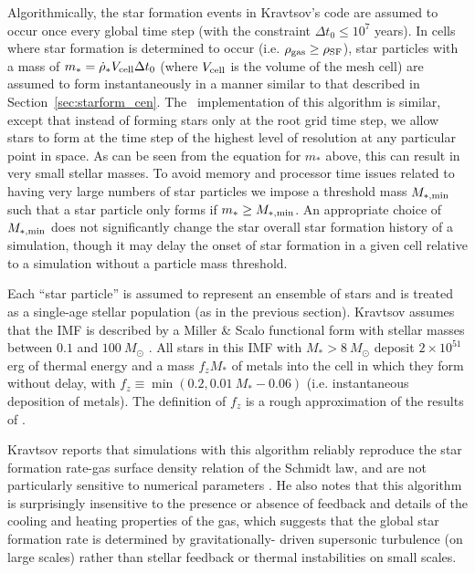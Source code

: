 Algorithmically, the star formation events in Kravtsov's code are
assumed to occur once every global time step (with the constraint $\Delta t_0 \leq
10^7$ years).
In cells where star formation is determined to occur (i.e. $\rho_{\rm
  gas} \geq \rho_{\rm SF}$), star particles with a mass of $m_* =
\dot{\rho}_* V_{\rm cell} \Delta t_0$ (where $V_{\rm cell}$ is the
volume of the mesh cell) are assumed to form instantaneously in a
manner similar to that described in Section~\ref{sec:starform_cen}.
The \enzo\ implementation of this algorithm is similar, except that
instead of forming stars only at the root grid time step, we allow
stars to form at the time step of the highest level of resolution at
any particular point in space.  As can be seen from the equation for
$m_*$ above, this can result in very small stellar masses.  To avoid
memory and processor time issues related to having very large numbers
of star particles we impose a threshold mass $M_{\rm *,min}$ such that
a star particle only forms if $m_* \geq M_{\rm *,min}$.  An
appropriate choice of $M_{\rm *,min}$ does not significantly change
the star overall star formation history of a simulation, though it may
delay the onset of star formation in a given cell relative to a
simulation without a particle mass threshold.

Each ``star particle'' is assumed to represent an ensemble of stars
and is treated as a single-age stellar population (as in the previous
section).  Kravtsov assumes that the IMF is described by a Miller \&
Scalo functional form with stellar masses between $0.1$ and
$100~M_\odot$ \citep{1979ApJS...41..513M}.  All stars in this IMF with
$M_* > 8~M_\odot$ deposit $2 \times 10^{51}$ erg of thermal energy
and a mass $f_z M_*$ of metals into the cell in which they form
without delay, with $f_z \equiv \min(0.2, 0.01~M_*-0.06)$
(i.e. instantaneous deposition of metals).  The definition of $f_z$ is
a rough approximation of the results of \citet{1995ApJS..101..181W}.

Kravtsov reports that simulations with this algorithm reliably
reproduce the star formation rate-gas surface density relation of the
Schmidt law, and are not particularly sensitive to numerical
parameters \citep{2003ApJ...590L...1K}.  He also notes that this
algorithm is surprisingly insensitive to the presence or absence of
feedback and details of the cooling and heating properties of the gas,
which suggests that the global star formation rate is determined by
gravitationally- driven supersonic turbulence (on large scales) rather
than stellar feedback or thermal instabilities on small scales.

